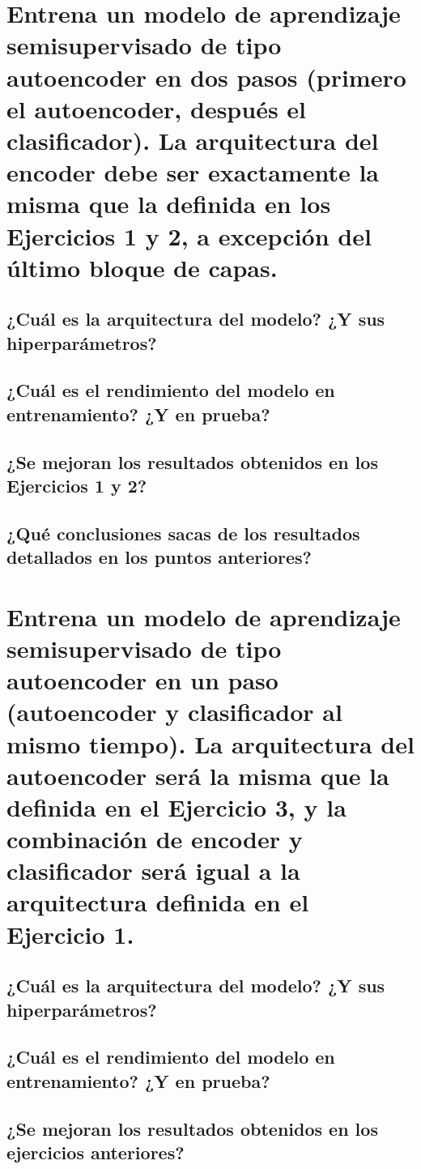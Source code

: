 \documentclass{article}
\begin{document}
\newpage
\section{Entrena un modelo de aprendizaje semisupervisado de tipo autoencoder en dos pasos (primero el autoencoder, después el clasificador). La arquitectura del encoder debe ser exactamente la misma que la definida en los Ejercicios 1 y 2, a excepción del último bloque de capas.}
\subsection{¿Cuál es la arquitectura del modelo? ¿Y sus hiperparámetros?}
\subsection{¿Cuál es el rendimiento del modelo en entrenamiento? ¿Y en prueba?}
\subsection{¿Se mejoran los resultados obtenidos en los Ejercicios 1 y 2?}
\subsection{¿Qué conclusiones sacas de los resultados detallados en los puntos anteriores?}

\newpage
\section{Entrena un modelo de aprendizaje semisupervisado de tipo autoencoder en un paso (autoencoder y clasificador al mismo tiempo). La arquitectura del autoencoder será la misma que la definida en el Ejercicio 3, y la combinación de encoder y clasificador será igual a la arquitectura definida en el Ejercicio 1.}
\subsection{¿Cuál es la arquitectura del modelo? ¿Y sus hiperparámetros?}
\subsection{¿Cuál es el rendimiento del modelo en entrenamiento? ¿Y en prueba?}
\subsection{¿Se mejoran los resultados obtenidos en los ejercicios anteriores?}
\end{document}
